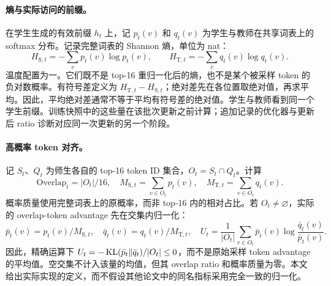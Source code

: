 \paragraph{熵与实际访问的前缀。}
在学生生成的有效前缀 $h_t$ 上，记 $p_t(v)$ 和 $q_t(v)$ 为学生与教师在共享词表上的 softmax 分布。记录完整词表的 Shannon 熵，单位为 nat：
\begin{equation}
 H_{\mathrm S,t}=-\sum_v p_t(v)\log p_t(v),\qquad
 H_{\mathrm T,t}=-\sum_v q_t(v)\log q_t(v).
\end{equation}
温度配置为一。它们既不是 top-16 重归一化后的熵，也不是某个被采样 token 的负对数概率。有符号差定义为 $H_{\mathrm T,t}-H_{\mathrm S,t}$；绝对差先在各位置取绝对值，再求平均。因此，平均绝对差通常不等于平均有符号差的绝对值。学生与教师看到同一个学生前缀。训练快照中的这些量在该批次更新之前计算；追加记录的优化器与更新后 ratio 诊断对应同一次更新的另一个阶段。

\paragraph{高概率 token 对齐。}
记 $S_t$、$Q_t$ 为师生各自的 top-16 token ID 集合，$O_t=S_t\cap Q_t$。计算
\begin{equation}
 \mathrm{Overlap}_t=|O_t|/16,\quad
 M_{\mathrm S,t}=\sum_{v\in O_t}p_t(v),\quad
 M_{\mathrm T,t}=\sum_{v\in O_t}q_t(v).
\end{equation}
概率质量使用完整词表上的原概率，而非 top-16 内的相对占比。若 $O_t\ne\varnothing$，实际的 overlap-token advantage 先在交集内归一化：
\begin{equation}
 \bar p_t(v)=p_t(v)/M_{\mathrm S,t},\quad
 \bar q_t(v)=q_t(v)/M_{\mathrm T,t},\quad
 U_t=\frac{1}{|O_t|}\sum_{v\in O_t}\bar p_t(v)
       \log\frac{\bar q_t(v)}{\bar p_t(v)}.
\end{equation}
因此，精确运算下 $U_t=-\operatorname{KL}(\bar p_t\Vert\bar q_t)/|O_t|\le0$，而不是原始采样 token advantage 的平均值。空交集不计入该量的均值，但其 overlap ratio 和概率质量为零。本文给出实际实现的定义，而不假设其他论文中的同名指标采用完全一致的归一化。

